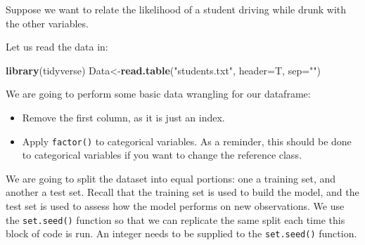 \documentclass[
]{book}
\newenvironment{Shaded}{\begin{snugshade}}{\end{snugshade}}
\newcommand{\AttributeTok}[1]{\textcolor[rgb]{0.13,0.29,0.53}{#1}}
\newcommand{\DecValTok}[1]{\textcolor[rgb]{0.00,0.00,0.81}{#1}}
\newcommand{\DocumentationTok}[1]{\textcolor[rgb]{0.56,0.35,0.01}{\textbf{\textit{#1}}}}
\newcommand{\FunctionTok}[1]{\textcolor[rgb]{0.13,0.29,0.53}{\textbf{#1}}}
\newcommand{\NormalTok}[1]{#1}
\newcommand{\OtherTok}[1]{\textcolor[rgb]{0.56,0.35,0.01}{#1}}
\newcommand{\SpecialCharTok}[1]{\textcolor[rgb]{0.81,0.36,0.00}{\textbf{#1}}}
\newcommand{\StringTok}[1]{\textcolor[rgb]{0.31,0.60,0.02}{#1}}
\providecommand{\tightlist}{%
  \setlength{\itemsep}{0pt}\setlength{\parskip}{0pt}}
\begin{document}
Suppose we want to relate the likelihood of a student driving while drunk with the other variables.

Let us read the data in:

\begin{Shaded}
\begin{Highlighting}[]
\FunctionTok{library}\NormalTok{(tidyverse)}
\NormalTok{Data}\OtherTok{\textless{}{-}}\FunctionTok{read.table}\NormalTok{(}\StringTok{"students.txt"}\NormalTok{, }\AttributeTok{header=}\NormalTok{T, }\AttributeTok{sep=}\StringTok{""}\NormalTok{)}
\end{Highlighting}
\end{Shaded}

We are going to perform some basic data wrangling for our dataframe:

\begin{itemize}
\tightlist
\item
  Remove the first column, as it is just an index.
\item
  Apply \texttt{factor()} to categorical variables. As a reminder, this should be done to categorical variables if you want to change the reference class.
\end{itemize}

\begin{Shaded}
\end{Shaded}

We are going to split the dataset into equal portions: one a training set, and another a test set. Recall that the training set is used to build the model, and the test set is used to assess how the model performs on new observations. We use the \texttt{set.seed()} function so that we can replicate the same split each time this block of code is run. An integer needs to be supplied to the \texttt{set.seed()} function.
\end{document}
